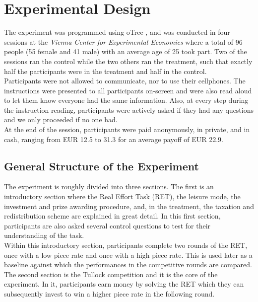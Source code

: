     \chapter{Experimental Design}
    \label{ch:experiment}
    \thispagestyle{fancy}
    
    The experiment was programmed using oTree \citep{chen2016}, and was conducted in four sessions at the \textit{Vienna Center for Experimental Economics} where a total of 96 people (55 female and 41 male) with an average age of 25 took part. Two of the sessions ran the control while the two others ran the treatment, such that exactly half the participants were in the treatment and half in the control.\\
    
    Participants were not allowed to communicate, nor to use their cellphones. The instructions were presented to all participants on-screen and were also read aloud to let them know everyone had the same information. Also, at every step during the instruction reading, participants were actively asked if they had any questions and we only proceeded if no one had.\\
    
    At the end of the session, participants were paid anonymously, in private, and in cash, ranging from EUR 12.5 to 31.3 for an average payoff of EUR 22.9.
    
    \section{General Structure of the Experiment}
    
    The experiment is roughly divided into three sections. The first is an introductory section where the Real Effort Task (RET), the leisure mode, the investment and prize awarding procedure, and, in the treatment, the taxation and redistribution scheme are explained in great detail. In this first section, participants are also asked several control questions to test for their understanding of the task.\\
    
    Within this introductory section, participants complete two rounds of the RET, once with a low piece rate and once with a high piece rate. This is used later as a baseline against which the performances in the competitive rounds are compared.\\
    
    The second section is the Tullock competition and it is the core of the experiment. In it, participants earn money by solving the RET which they can subsequently invest to win a higher piece rate in the following round.\\
    
